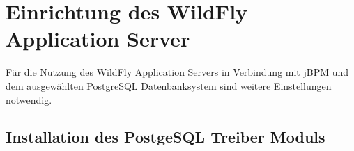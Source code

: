 \section{Einrichtung des WildFly Application Server}
Für die Nutzung des WildFly Application Servers in Verbindung mit jBPM und dem ausgewählten PostgreSQL Datenbanksystem sind weitere Einstellungen notwendig.

\subsection{Installation des PostgeSQL Treiber Moduls}
